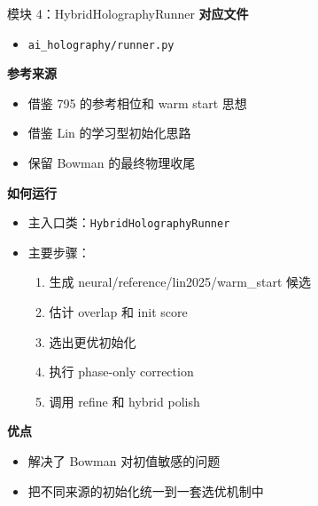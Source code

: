 \documentclass[aspectratio=169,10pt]{ctexbeamer}
\begin{document}
\begin{frame}{模块 4：HybridHolographyRunner}
  \textbf{对应文件}
  \begin{itemize}
    \item \texttt{ai\_holography/runner.py}
  \end{itemize}

  \textbf{参考来源}
  \begin{itemize}
    \item 借鉴 795 的参考相位和 warm start 思想
    \item 借鉴 Lin 的学习型初始化思路
    \item 保留 Bowman 的最终物理收尾
  \end{itemize}

  \textbf{如何运行}
  \begin{itemize}
    \item 主入口类：\texttt{HybridHolographyRunner}
    \item 主要步骤：
    \begin{enumerate}
      \item 生成 neural/reference/lin2025/warm\_start 候选
      \item 估计 overlap 和 init score
      \item 选出更优初始化
      \item 执行 phase-only correction
      \item 调用 refine 和 hybrid polish
    \end{enumerate}
  \end{itemize}

  \textbf{优点}
  \begin{itemize}
    \item 解决了 Bowman 对初值敏感的问题
    \item 把不同来源的初始化统一到一套选优机制中
  \end{itemize}
\end{frame}
\end{document}
